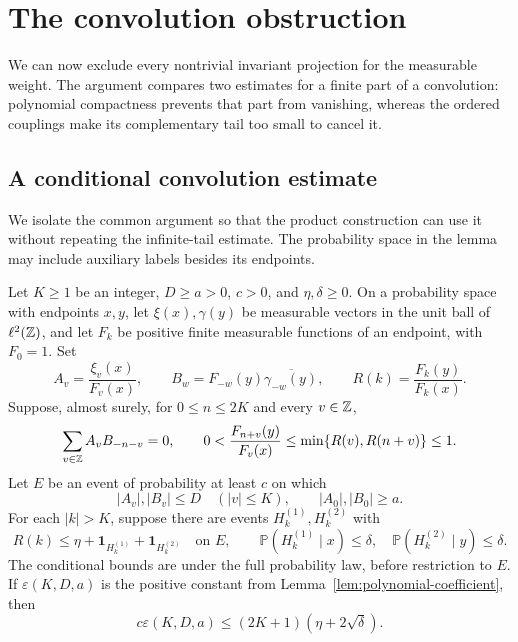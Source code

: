 \section{The convolution obstruction}
\label{sec:obstruction}

We can now exclude every nontrivial invariant projection for the measurable
weight. The argument compares two estimates for a finite part of a
convolution: polynomial compactness prevents that part from vanishing,
whereas the ordered couplings make its complementary tail too small to
cancel it.

\subsection{A conditional convolution estimate}

We isolate the common argument so that the product construction can use
it without repeating the infinite-tail estimate.  The probability space
in the lemma may include auxiliary labels besides its endpoints.

\begin{lemma}
\label{lem:conditional-convolution}
Let $K\ge1$ be an integer, $D\ge a>0$, $c>0$, and
$\eta,\delta\ge0$.  On a probability space with endpoints $x,y$, let
$\xi(x),\gamma(y)$ be measurable vectors in the unit ball of
$\ell^2(\mathbb Z)$, and let $F_k$ be positive finite measurable functions of
an endpoint, with $F_0=1$.  Set
\[
 A_v=\frac{\xi_v(x)}{F_v(x)},\qquad
 B_w=F_{-w}(y)\overline{\gamma_{-w}(y)},\qquad
 R(k)=\frac{F_k(y)}{F_k(x)}.
\]
Suppose, almost surely, for $0\le n\le2K$ and every $v\in\mathbb Z$,
\begin{equation}\label{eq:generic-convolution}
 \sum_{v\in\mathbb Z}A_vB_{-n-v}=0,\qquad
 0<\frac{F_{n+v}(y)}{F_v(x)}
       \le\min\{R(v),R(n+v)\}\le1.
\end{equation}
Let $E$ be an event of probability at least $c$ on which
\[
 |A_v|,|B_v|\le D\quad(|v|\le K),\qquad
 |A_0|,|B_0|\ge a.
\]
For each $|k|>K$, suppose there are events $H_k^{(1)},H_k^{(2)}$ with
\begin{equation}\label{eq:generic-tail}
 R(k)\le\eta+\mathbf1_{H_k^{(1)}}+\mathbf1_{H_k^{(2)}}\quad\text{on }E,
 \qquad
 \mathbb P(H_k^{(1)}\mid x)\le\delta,\quad
 \mathbb P(H_k^{(2)}\mid y)\le\delta.
\end{equation}
The conditional bounds are under the full probability law, before
restriction to $E$.  If $\varepsilon(K,D,a)$ is the positive constant
from Lemma~\ref{lem:polynomial-coefficient}, then
\begin{equation}\label{eq:generic-obstruction}
 c\varepsilon(K,D,a)\le(2K+1)(\eta+2\sqrt\delta).
\end{equation}
\end{lemma}


